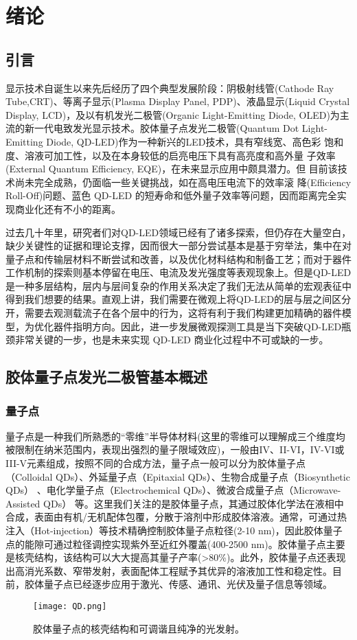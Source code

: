 
\chapter{绪论}
\section{引言}
显示技术自诞生以来先后经历了四个典型发展阶段：阴极射线管(Cathode Ray Tube,CRT)、等离子显示(Plasma Display Panel, PDP)、液晶显示(Liquid Crystal Display, LCD)，及以有机发光二极管(Organic Light-Emitting Diode, OLED)为主流的新一代电致发光显示技术\cite{pan2020}。胶体量子点发光二极管(Quantum Dot Light-Emitting Diode, QD-LED)作为一种新兴的LED技术，具有窄线宽、高色彩
饱和度、溶液可加工性，以及在本身较低的启亮电压下具有高亮度和高外量
子效率(External Quantum Efficiency, EQE)，在未来显示应用中颇具潜力。但
目前该技术尚未完全成熟，仍面临一些关键挑战，如在高电压电流下的效率滚
降(Efficiency Roll-Off)问题、蓝色 QD-LED 的短寿命和低外量子效率等问题，因而距离完全实现商业化还有不小的距离。

过去几十年里，研究者们对QD-LED领域已经有了诸多探索，但仍存在大量空白，缺少关键性的证据和理论支撑，因而很大一部分尝试基本是基于穷举法，集中在对量子点和传输层材料不断尝试和改善，以及优化材料结构和制备工艺；而对于器件工作机制的探索则基本停留在电压、电流及发光强度等表观现象上。但是QD-LED是一种多层结构，层内与层间复杂的作用关系决定了我们无法从简单的宏观表征中得到我们想要的结果。直观上讲，我们需要在微观上将QD-LED的层与层之间区分开，需要去观测载流子在各个层中的行为，这将有利于我们构建更加精确的器件模型，为优化器件指明方向。因此，进一步发展微观探测工具是当下突破QD-LED瓶颈非常关键的一步，也是未来实现 QD-LED 商业化过程中不可或缺的一步。
\section{胶体量子点发光二极管基本概述}
\subsection{量子点}
量子点是一种我们所熟悉的“零维”半导体材料(这里的零维可以理解成三个维度均被限制在纳米范围内，表现出强烈的量子限域效应)，一般由IV、II-VI，IV-VI或III-V元素组成，按照不同的合成方法，量子点一般可以分为胶体量子点（Colloidal QDs）、外延量子点（Epitaxial QDs）、生物合成量子点（Biosynthetic QDs）
、电化学量子点（Electrochemical QDs）、微波合成量子点（Microwave-Assisted QDs）
等。这里我们关注的是胶体量子点，其通过胶体化学法在液相中合成，表面由有机/无机配体包覆，分散于溶剂中形成胶体溶液。通常，可通过热注入（Hot-injection）等技术精确控制胶体量子点粒径(2-10 nm)，因此胶体量子点的能隙可通过粒径调控实现紫外至近红外覆盖(400-2500 nm)。胶体量子点主要是核壳结构，该结构可以大大提高其量子产率(>80\%)。此外，胶体量子点还表现出高消光系数、窄带发射，表面配体工程赋予其优异的溶液加工性和稳定性。目前，胶体量子点已经逐步应用于激光、传感、通讯、光伏及量子信息等领域。
\begin{figure}[ht]
	\centering
	\texttt{[image: QD.png]}
	\caption{胶体量子点的核壳结构和可调谐且纯净的光发射\cite{shirasaki2013emergence}。}
	\label{fig:QD}
\end{figure}
